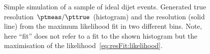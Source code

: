\documentclass[a4paper]{cmspaper} %
\begin{document}
\begin{figure}[ht]
  \begin{center}
     
  \end{center}
  \caption{Simple simulation of a sample of ideal dijet events.
    Generated true resolution \mbox{$\ptmeas / \pttrue$} (histogram) and the resolution (solid line) from the maximum likelihood fit in two different \pttrue bins.
    Note, here ``fit'' does not refer to a fit to the shown histogram but the maximisation of the likelihood~\eqref{eq:resFit:likelihood}.
  }
  \label{fig:resFit:toyMC:ptGenCuts:reso}
\end{figure}
\end{document}
